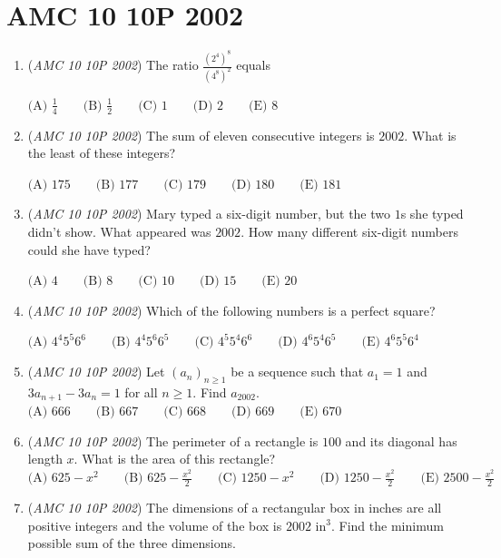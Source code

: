 \section{AMC 10 10P 2002}
        \begin{enumerate}
        	\item (\textit{AMC 10 10P 2002}) The ratio $\frac{(2^4)^8}{(4^8)^2}$ equals


 $\text{(A) }\frac{1}{4} \qquad \text{(B) }\frac{1}{2} \qquad \text{(C) }1 \qquad \text{(D) }2 \qquad \text{(E) }8$


	\item (\textit{AMC 10 10P 2002}) The sum of eleven consecutive integers is $2002.$ What is the least of these integers?


 $\text{(A) }175 \qquad \text{(B) }177 \qquad \text{(C) }179 \qquad \text{(D) }180 \qquad \text{(E) }181$


	\item (\textit{AMC 10 10P 2002}) Mary typed a six-digit number, but the two $1$s she typed didn't show. What appeared was $2002.$ How many different six-digit numbers could she have typed?


 $\text{(A) }4 \qquad \text{(B) }8 \qquad \text{(C) }10 \qquad \text{(D) }15 \qquad \text{(E) }20$


	\item (\textit{AMC 10 10P 2002}) Which of the following numbers is a perfect square?


 $\text{(A) }4^4 5^5 6^6 \qquad \text{(B) }4^4 5^6 6^5 \qquad \text{(C) }4^5 5^4 6^6 \qquad \text{(D) }4^6 5^4 6^5 \qquad \text{(E) }4^6 5^5 6^4$


	\item (\textit{AMC 10 10P 2002}) Let $(a_n)_{n \geq 1}$ be a sequence such that $a_1 = 1$ and $3a_{n+1} - 3a_n = 1$ for all $n \geq 1.$ Find $a_{2002}.$
$\text{(A) }666 \qquad \text{(B) }667 \qquad \text{(C) }668 \qquad \text{(D) }669 \qquad \text{(E) }670$


	\item (\textit{AMC 10 10P 2002}) The perimeter of a rectangle is $100$ and its diagonal has length $x.$ What is the area of this rectangle?
$\text{(A) }625-x^2 \qquad \text{(B) }625-\frac{x^2}{2} \qquad \text{(C) }1250-x^2 \qquad \text{(D) }1250-\frac{x^2}{2} \qquad \text{(E) }2500-\frac{x^2}{2}$


	\item (\textit{AMC 10 10P 2002}) The dimensions of a rectangular box in inches are all positive integers and the volume of the box is $2002$ in$^3$. Find the minimum possible sum of the three dimensions.



\end{enumerate}
